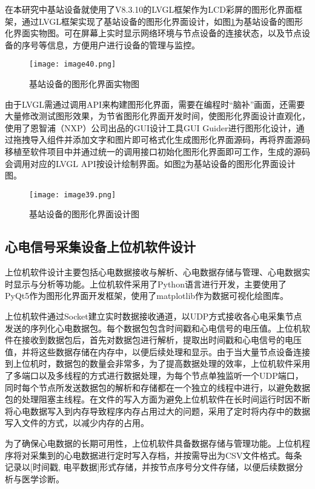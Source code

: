 在本研究中基站设备就使用了V8.3.10的LVGL框架作为LCD彩屏的图形化界面框架，通过LVGL框架实现了基站设备的图形化界面设计，如图\ref{F.ECG_image40}为基站设备的图形化界面实物图。可在屏幕上实时显示网络环境与节点设备的连接状态，以及节点设备的序号等信息，方便用户进行设备的管理与监控。

\begin{figure}[htb]
    \centering
    \texttt{[image: image40.png]}
    \caption{基站设备的图形化界面实物图}
    \label{F.ECG_image40}
\end{figure}

由于LVGL需通过调用API来构建图形化界面，需要在编程时“脑补”画面，还需要大量修改测试图形效果，为节省图形化界面开发时间，使图形化界面设计直观化，使用了恩智浦（NXP）公司出品的GUI设计工具GUI Guider进行图形化设计，通过拖拽导入组件并添加文字和图片即可格式化生成图形化界面源码，再将界面源码移植至软件项目中并通过统一的调用接口初始化图形化界面即可工作，生成的源码会调用对应的LVGL API按设计绘制界面。如图\ref{F.ECG_image39}为基站设备的图形化界面设计图。

\begin{figure}[htb]
    \centering
    \texttt{[image: image39.png]}
    \caption{基站设备的图形化界面设计图}
    \label{F.ECG_image39}
\end{figure}

\subsection{心电信号采集设备上位机软件设计}

上位机软件设计主要包括心电数据接收与解析、心电数据存储与管理、心电数据实时显示与分析等功能。上位机软件采用了Python语言进行开发，主要使用了PyQt5作为图形化界面开发框架，使用了matplotlib作为数据可视化绘图库。

上位机软件通过Socket建立实时数据接收通道，以UDP方式接收各心电采集节点发送的序列化心电数据包。每个数据包包含时间戳和心电信号的电压值。上位机软件在接收到数据包后，首先对数据包进行解析，提取出时间戳和心电信号的电压值，并将这些数据存储在内存中，以便后续处理和显示。由于当大量节点设备连接到上位机时，数据包的数量会非常多，为了提高数据处理的效率，上位机软件采用了多端口以及多线程的方式进行数据处理，为每个节点单独监听一个UDP端口，同时每个节点所发送数据包的解析和存储都在一个独立的线程中进行，以避免数据包的处理阻塞主线程。在文件的写入方面为避免上位机软件在长时间运行时因不断将心电数据写入到内存导致程序内存占用过大的问题，采用了定时将内存中的数据写入文件的方式，以减少内存的占用。

为了确保心电数据的长期可用性，上位机软件具备数据存储与管理功能。上位机程序将对采集到的心电数据进行定时写入存档，并按需导出为CSV文件格式。每条记录以[时间戳, 电平数据]形式存储，并按节点序号分文件存储，以便后续数据分析与医学诊断。

